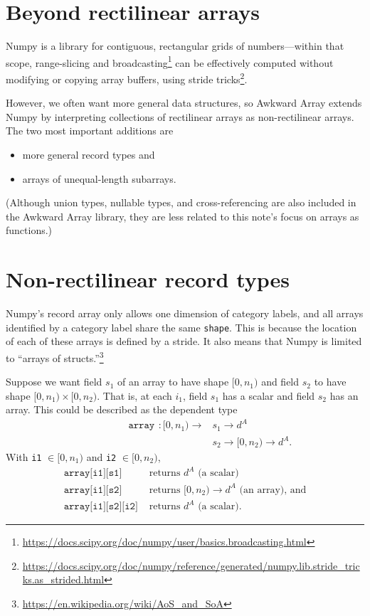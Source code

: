 \documentclass[12pt]{article}
\begin{document}
\section*{Beyond rectilinear arrays}

Numpy is a library for contiguous, rectangular grids of numbers---within that scope, range-slicing and broadcasting\footnote{\url{https://docs.scipy.org/doc/numpy/user/basics.broadcasting.html}} can be effectively computed without modifying or copying array buffers, using stride tricks\footnote{\url{https://docs.scipy.org/doc/numpy/reference/generated/numpy.lib.stride_tricks.as_strided.html}}.

However, we often want more general data structures, so Awkward Array extends Numpy by interpreting collections of rectilinear arrays as non-rectilinear arrays. The two most important additions are
\begin{itemize}
\item more general record types and
\item arrays of unequal-length subarrays.
\end{itemize}
\noindent (Although union types, nullable types, and cross-referencing are also included in the Awkward Array library, they are less related to this note's focus on arrays as functions.)

\vfill

\section*{Non-rectilinear record types}

Numpy's record array only allows one dimension of category labels, and all arrays identified by a category label share the same \texttt{shape}. This is because the location of each of these arrays is defined by a stride. It also means that Numpy is limited to ``arrays of structs.''\footnote{\url{https://en.wikipedia.org/wiki/AoS_and_SoA}}

Suppose we want field $s_1$ of an array to have shape $[0, n_1)$ and field $s_2$ to have shape $[0, n_1) \times [0, n_2)$. That is, at each $i_1$, field $s_1$ has a scalar and field $s_2$ has an array. This could be described as the dependent type
\begin{align*}
\phantom{\mbox{ufunc}(f)(}\texttt{array}\phantom{)}: [0, n_1) \to & s_1 \to d^A \\
 & s_2 \to [0, n_2) \to d^A\mbox{.}
\end{align*}
With \texttt{i1} $\in [0, n_1)$ and \texttt{i2} $\in [0, n_2)$,
\begin{align*}
\texttt{array[i1][s1]} & \mbox{ returns } d^A\mbox{ (a scalar)} \\
\texttt{array[i1][s2]} & \mbox{ returns } [0, n_2) \to d^A\mbox{ (an array), and} \\
\texttt{array[i1][s2][i2]} & \mbox{ returns } d^A\mbox{ (a scalar).}
\end{align*}
\end{document}
